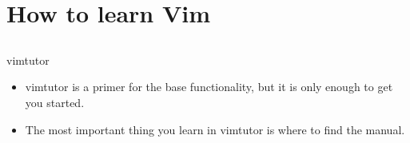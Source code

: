 \documentclass{beamer}
\begin{document}
    \section{How to learn Vim}
    \subsection{}
    \begin{frame}{vimtutor}
        \begin{itemize}
            \item vimtutor is a primer for the base functionality, but it is only enough to get you started.
            \item The most important thing you learn in vimtutor is where to find the manual.
        \end{itemize}
    \end{frame}
\end{document}
